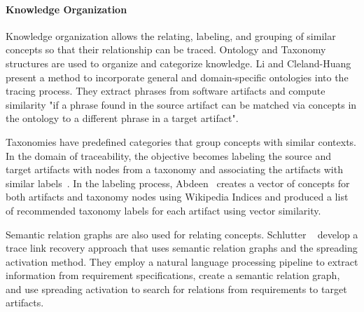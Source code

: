 \paragraph{Knowledge Organization} Knowledge organization allows the relating, labeling, and grouping of similar concepts so that their relationship can be traced. Ontology and Taxonomy structures are used to organize and categorize knowledge.
Li and Cleland-Huang~\cite{Ontology} present a method to incorporate general and domain-specific ontologies into the tracing process. They extract phrases from software artifacts and compute similarity "if a phrase found in the source artifact can be matched via concepts in the ontology to a different phrase in a target
artifact".

Taxonomies have predefined categories that group concepts with similar contexts. In the domain of traceability, the objective becomes labeling the source and target artifacts with nodes from a taxonomy and associating the artifacts with similar labels~\cite{Taxonomy}. In the labeling process, Abdeen~\cite{abdeen-2023} creates a vector of concepts for both artifacts and taxonomy nodes using Wikipedia Indices and produced a list of recommended taxonomy labels for each artifact using vector similarity.

Semantic relation graphs are also used for relating concepts. Schlutter \etal{}~\cite{Spreading-Activation} develop a trace link recovery approach that uses semantic relation graphs and the spreading activation method. They employ a natural language processing pipeline to extract information from requirement specifications, create a semantic relation graph, and use spreading activation to search for relations from requirements to target artifacts.

